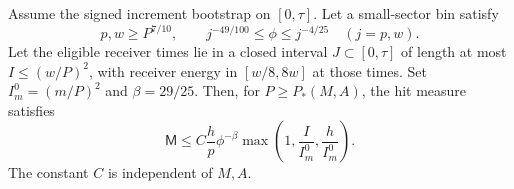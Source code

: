 \begin{lemma}\label{ang:improved-hit}
Assume the signed increment bootstrap on $[0,\tau]$.
Let a small-sector bin satisfy
\begin{equation}\label{ang:window}
 p,w\ge P^{7/10},\qquad
 j^{-49/100}\le\phi\le j^{-4/25}\quad(j=p,w).
\end{equation}
Let the eligible receiver times lie in a closed interval $J\subset[0,\tau]$ of length at most
$I\le(w/P)^2$, with receiver energy in $[w/8,8w]$ at those times.
Set $I_m^0=(m/P)^2$ and $\beta=29/25$. Then, for
$P\ge P_*(M,A)$, the hit measure satisfies
\begin{equation}\label{ang:improved-occupation}
 \mathsf M\le C\frac hp\phi^{-\beta}
      \max\left(1,\frac I{I_m^0},\frac h{I_m^0}\right).
\end{equation}
The constant $C$ is independent of $M,A$.
\end{lemma}


